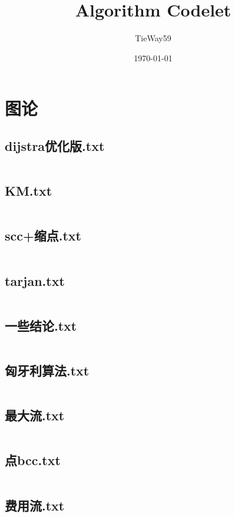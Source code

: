 \documentclass[a4paper,11pt]{article}
\author{TieWay59}
\title{Algorithm Codelet}
\date{\today}
\begin{document}
 
\maketitle          %
\newpage            %
\tableofcontents    %

\newpage

\section{图论}
\subsection{dijstra优化版.txt}
\inputminted{c++}{"D:/tmplz/templates/图论/dijstra优化版.txt"}
\subsection{KM.txt}
\inputminted{c++}{"D:/tmplz/templates/图论/KM.txt"}
\subsection{scc+缩点.txt}
\inputminted{c++}{"D:/tmplz/templates/图论/scc+缩点.txt"}
\subsection{tarjan.txt}
\inputminted{c++}{"D:/tmplz/templates/图论/tarjan.txt"}
\subsection{一些结论.txt}
\inputminted{c++}{"D:/tmplz/templates/图论/一些结论.txt"}
\subsection{匈牙利算法.txt}
\inputminted{c++}{"D:/tmplz/templates/图论/匈牙利算法.txt"}
\subsection{最大流.txt}
\inputminted{c++}{"D:/tmplz/templates/图论/最大流.txt"}
\subsection{点bcc.txt}
\inputminted{c++}{"D:/tmplz/templates/图论/点bcc.txt"}
\subsection{费用流.txt}
\inputminted{c++}{"D:/tmplz/templates/图论/费用流.txt"}
\end{document}
